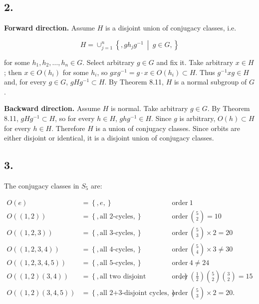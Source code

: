 \subsection{2.}

\textbf{Forward direction.} Assume \(H\) is a disjoint union of conjugacy classes, i.e.

\[H = \cup_{j = 1}^{n}\left\{ ,gh_{j}g^{- 1}\  \middle| \ g \in G, \right\}\]

for some \(h_{1},h_{2},\ldots,h_{n} \in G\). Select arbitrary \(g \in G\) and fix it. Take arbitrary \(x \in H\); then \(x \in O\left( h_{i} \right)\) for some \(h_{i}\), so \(gxg^{- 1} = g \cdot x \in O\left( h_{i} \right) \subset H\). Thus \(g^{- 1}xg \in H\) and, for every \(g \in G\), \(gHg^{- 1} \subset H\). By Theorem 8.11, \(H\) is a normal subgroup of \(G\).

\textbf{Backward direction.} Assume \(H\) is normal. Take arbitrary \(g \in G\). By Theorem 8.11, \(gHg^{- 1} \subset H\), so for every \(h \in H\), \(ghg^{- 1} \in H\). Since \(g\) is arbitrary, \(O(h) \subset H\) for every \(h \in H\). Therefore \(H\) is a union of conjugacy classes. Since orbits are either disjoint or identical, it is a disjoint union of conjugacy classes.

\subsection{3.}

The conjugacy classes in \(S_{5}\) are:

\[\begin{matrix}
{O(e)} & {= \left\{ {,e,} \right\}\ } & & {\text{order}\ 1} \\
{O\left( \left( {1,2} \right) \right)} & {= \left\{ {,\text{all 2-cycles},} \right\}\ } & & {\text{order}\ \binom{5}{2} = 10} \\
{O\left( \left( {1,2,3} \right) \right)} & {= \left\{ {,\text{all 3-cycles},} \right\}\ } & & {\text{order}\ \binom{5}{3} \times 2 = 20} \\
{O\left( \left( {1,2,3,4} \right) \right)} & {= \left\{ {,\text{all 4-cycles},} \right\}\ } & & {\text{order}\ \binom{5}{4} \times 3 \neq 30} \\
{O\left( \left( {1,2,3,4,5} \right) \right)} & {= \left\{ {,\text{all 5-cycles},} \right\}\ } & & {\text{order}\ 4 \neq 24} \\
{O\left( {\left( {1,2} \right)\left( {3,4} \right)} \right)} & {= \left\{ {,\text{all two disjoint transpositions},} \right\}\ } & & {\text{order}\ \left( \frac{1}{2} \right)\binom{5}{2}\binom{3}{2} = 15} \\
{O\left( {\left( {1,2} \right)\left( {3,4,5} \right)} \right)} & {= \left\{ {,\text{all 2+3-disjoint cycles},} \right\}\ } & & {\text{order}\ \binom{5}{3} \times 2 = 20.}
\end{matrix}\]

